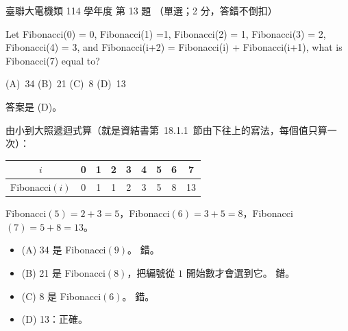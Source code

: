 \begin{pastexam}[label={px:ust-114-ee-ds-13}]{臺聯大電機類 114 學年度 第 13 題}
（單選；2 分，答錯不倒扣）

Let Fibonacci(0) = 0, Fibonacci(1) =1, Fibonacci(2) = 1, Fibonacci(3) = 2, Fibonacci(4) = 3, and
Fibonacci(i+2) = Fibonacci(i) + Fibonacci(i+1), what is Fibonacci(7) equal to?

(A)~34 \qquad (B)~21 \qquad (C)~8 \qquad (D)~13
\end{pastexam}

\begin{pastsoln}
答案是 (D)。

由小到大照遞迴式算（就是資結書第~18.1.1~節由下往上的寫法，每個值只算一次）：
\begin{center}
\begin{tabular}{c*{8}{c}}
\toprule
$i$ & 0 & 1 & 2 & 3 & 4 & 5 & 6 & 7 \\
\midrule
Fibonacci$(i)$ & 0 & 1 & 1 & 2 & 3 & 5 & 8 & 13 \\
\bottomrule
\end{tabular}
\end{center}
Fibonacci$(5) = 2 + 3 = 5$，Fibonacci$(6) = 3 + 5 = 8$，Fibonacci$(7) = 5 + 8 = 13$。
\begin{itemize}
\item (A) 34 是 Fibonacci$(9)$。 錯。
\item (B) 21 是 Fibonacci$(8)$，把編號從 $1$ 開始數才會選到它。 錯。
\item (C) 8 是 Fibonacci$(6)$。 錯。
\item (D) 13：正確。
\end{itemize}
\end{pastsoln}
